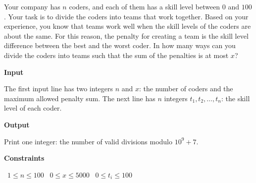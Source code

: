 Your company has $n$ coders, and each of them has a skill level between $0$ and $100$. Your task is to divide the coders into teams that work together.
Based on your experience, you know that teams work well when the skill levels of the coders are about the same. For this reason, the penalty for creating a team is the skill level difference between the best and the worst coder.
In how many ways can you divide the coders into teams such that the sum of the penalties is at most $x$?

\vspace{0.3cm}\noindent\textbf{Input}

The first input line has two integers $n$ and $x$: the number of coders and the maximum allowed penalty sum.
The next line has $n$ integers $t_1,t_2,\dots,t_n$: the skill level of each coder.

\vspace{0.3cm}\noindent\textbf{Output}

Print one integer: the number of valid divisions modulo $10^9+7$.

\vspace{0.3cm}\noindent\textbf{Constraints}

\textbullet\ $1 \le n \le 100$
\textbullet\ $0 \le x \le 5000$
\textbullet\ $0 \le t_i \le 100$